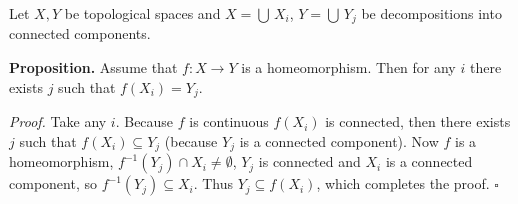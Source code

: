 \documentclass[12pt]{article}
\begin{document}
Let $X,Y$ be topological spaces and $X=\bigcup\, X_i$, $Y=\bigcup\, Y_j$ be decompositions into connected components.

\textbf{Proposition.} Assume that $f:X\to Y$ is a homeomorphism. Then for any $i$ there exists $j$ such that $f(X_i)=Y_j$.

\textit{Proof.} Take any $i$. Because $f$ is continuous $f(X_i)$ is connected, then there exists $j$ such that $f(X_i)\subseteq Y_j$ (because $Y_j$ is a connected component). Now $f$ is a homeomorphism, $f^{-1}(Y_j)\cap X_i\neq\emptyset$, $Y_j$ is connected and $X_i$ is a connected component, so $f^{-1}(Y_j)\subseteq X_i$. Thus $Y_j\subseteq f(X_i)$, which completes the proof. $\square$
\end{document}
